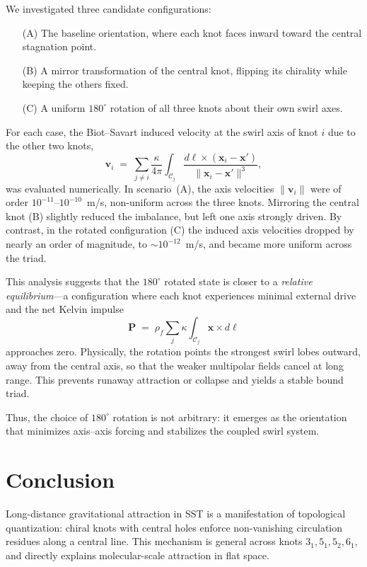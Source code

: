 \documentclass[11pt]{article}
\newcommand{\rhoF}{\rho_{\!f}}
\begin{document}
We investigated three candidate configurations:
\begin{enumerate}
    \item[(A)] The baseline orientation, where each knot faces inward toward
    the central stagnation point.
    \item[(B)] A mirror transformation of the central knot, flipping its
    chirality while keeping the others fixed.
    \item[(C)] A uniform $180^\circ$ rotation of all three knots about their
    own swirl axes.
\end{enumerate}
For each case, the Biot--Savart induced velocity at the swirl axis of knot
$i$ due to the other two knots,
\begin{equation}
\mathbf{v}_i \;=\; \sum_{j\neq i} \frac{\kappa}{4\pi}
\int_{\mathcal{C}_j} \frac{d\boldsymbol{\ell}\times
(\mathbf{x}_i-\mathbf{x}')}{\lVert \mathbf{x}_i-\mathbf{x}' \rVert^3},
\end{equation}
was evaluated numerically. In scenario~(A), the axis velocities
$\lVert\mathbf{v}_i\rVert$ were of order $10^{-11}$--$10^{-10}$~m/s,
non-uniform across the three knots. Mirroring the central knot (B) slightly
reduced the imbalance, but left one axis strongly driven. By contrast, in the
rotated configuration (C) the induced axis velocities dropped by nearly an
order of magnitude, to $\sim 10^{-12}$~m/s, and became more uniform across
the triad.

This analysis suggests that the $180^\circ$ rotated state is closer to a
\emph{relative equilibrium}---a configuration where each knot experiences
minimal external drive and the net Kelvin impulse
\begin{equation}
\mathbf{P} \;=\; \rhoF \sum_j \kappa \int_{\mathcal{C}_j}
\mathbf{x} \times d\boldsymbol{\ell}
\end{equation}
approaches zero. Physically, the rotation points the strongest swirl lobes
outward, away from the central axis, so that the weaker multipolar fields
cancel at long range. This prevents runaway attraction or collapse and yields
a stable bound triad.

Thus, the choice of $180^\circ$ rotation is not arbitrary: it emerges as the
orientation that minimizes axis--axis forcing and stabilizes the coupled swirl
system.

\section{Conclusion}
Long-distance gravitational attraction in SST is a manifestation of topological quantization: chiral knots with central holes enforce non-vanishing circulation residues along a central line.
This mechanism is general across knots $3_1, 5_1, 5_2, 6_1$, and directly explains molecular-scale attraction in flat space.



\end{document}

